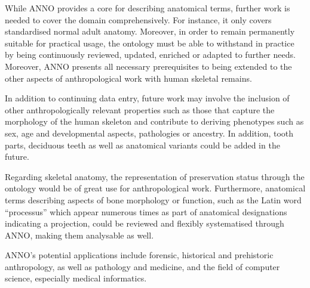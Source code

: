 \documentclass[sw]{iosart2x}
\begin{document}
While ANNO provides a core for describing anatomical terms, further work is needed to cover the domain comprehensively.
For instance, it only covers standardised normal adult anatomy.
Moreover, in order to remain permanently suitable for practical usage, the ontology must be able to withstand in practice by being continuously reviewed, updated, enriched or adapted to further needs.
Moreover, ANNO presents all necessary prerequisites to being extended to the other aspects of anthropological work with human skeletal remains.

In addition to continuing data entry, future work may involve the inclusion of other anthropologically relevant properties such as those that capture the morphology of the human skeleton and contribute to deriving phenotypes such as sex, age and developmental aspects, pathologies or ancestry.
In addition, tooth parts, deciduous teeth as well as anatomical variants could be added in the future.

Regarding skeletal anatomy, the representation of preservation status through the ontology would be of great use for anthropological work.
Furthermore, anatomical terms describing aspects of bone morphology or function, such as the Latin word “processus” which appear numerous times as part of anatomical designations indicating a projection, could be reviewed and flexibly systematised through ANNO, making them analysable as well.

ANNO’s potential applications include forensic, historical and prehistoric anthropology, as well as pathology and medicine, and the field of computer science, especially medical informatics.

\end{document}
